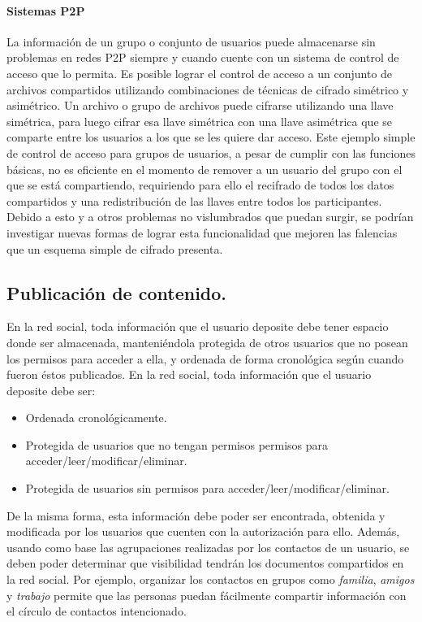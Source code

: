     \paragraph{Sistemas P2P}
    La información de un grupo o conjunto de usuarios puede almacenarse sin problemas en redes
    P2P siempre y cuando cuente con un sistema de control de acceso que lo
    permita.
     Es posible lograr el control de acceso a un conjunto de
    archivos compartidos utilizando combinaciones de técnicas de cifrado simétrico
    y asimétrico. Un archivo o grupo de archivos puede cifrarse utilizando una
    llave simétrica, para luego cifrar esa llave simétrica con una llave
    asimétrica que se comparte entre los usuarios a los que se les quiere dar
    acceso. Este ejemplo simple de control de acceso para grupos de usuarios, a
    pesar de cumplir con las funciones básicas, no es eficiente en el momento de
    remover a un usuario del grupo con el que se está compartiendo, requiriendo
    para ello el recifrado de todos los datos compartidos y una
    redistribución de las llaves entre todos los participantes. Debido a esto y
    a otros problemas no vislumbrados que puedan surgir, se podrían investigar
    nuevas formas de lograr esta funcionalidad que mejoren las falencias que un
    esquema simple de cifrado presenta.

\subsection{Publicación de contenido.}
\label{sec:publicaciones}

    En la red social, toda información que el usuario deposite debe tener espacio
    donde ser almacenada, manteniéndola protegida de otros usuarios que no posean
    los permisos para acceder a ella, y ordenada de forma cronológica según
    cuando fueron éstos publicados.
    En la red social, toda información que el usuario deposite debe ser:
    \begin{itemize}
      \item Ordenada cronológicamente.
      \item Protegida de usuarios que no tengan permisos permisos para acceder/leer/modificar/eliminar.
      \item Protegida de usuarios sin permisos para acceder/leer/modificar/eliminar.
    \end{itemize}
    De la misma forma, esta información debe poder ser encontrada, obtenida y
    modificada por los usuarios que cuenten con la autorización para ello.
    Además, usando como base las agrupaciones realizadas por los contactos de un
    usuario, se deben poder determinar que visibilidad tendrán los documentos compartidos en la red social. Por ejemplo, organizar los
    contactos en grupos como \textit{familia}, \textit{amigos} y \textit{trabajo}
    permite que las personas puedan fácilmente compartir información con el círculo
    de contactos intencionado.
    
